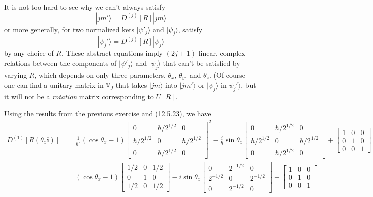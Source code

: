 \documentclass[../principles-of-quantum-mechanics.tex]{subfiles}
\begin{document}
\begin{questions}
		It is not too hard to see why we can't always satisfy
		$$|jm'\rangle = D^{(j)}[R]|jm\rangle$$
		or more generally, for two normalized kets $|\psi'_j\rangle$ and $|\psi_j\rangle$, satisfy
		$$|\psi_j'\rangle = D^{(j)}[R]|\psi_j\rangle$$
		by any choice of $R$. These abstract equations imply $(2j + 1)$ linear, complex relations between the components of $|\psi'_j\rangle$ and $|\psi_j\rangle$ that can't be satisfied by varying $R$, which depends on only three parameters, $\theta_x$, $\theta_y$, and $\theta_z$. (Of course one can find a unitary matrix in $\mathbb{V}_J$ that takes $|jm\rangle$ into $|jm'\rangle$ or $|\psi_j\rangle$ in $\psi_j'\rangle$, but it will not be a \textit{rotation} matrix corresponding to $U[R]$.
		
		\begin{solution}
			Using the results from the previous exercise and (12.5.23), we have
			\begin{align*}
				D^{(1)}[R(\theta_x\mathbf{i})] &= \frac{1}{\hbar^2}(\cos\theta_x - 1)\begin{bmatrix}0 & \hbar/2^{1/2} & 0 \\ \hbar/2^{1/2} & 0 & \hbar/2^{1/2} \\ 0 & \hbar/2^{1/2} & 0\end{bmatrix}^2 - \frac{i}{\hbar}\sin\theta_x\begin{bmatrix}0 & \hbar/2^{1/2} & 0 \\ \hbar/2^{1/2} & 0 & \hbar/2^{1/2} \\ 0 & \hbar/2^{1/2} & 0\end{bmatrix} + \begin{bmatrix}1 & 0 & 0 \\ 0 & 1 & 0 \\ 0 & 0 & 1\end{bmatrix} \\
				&= (\cos\theta_x - 1)\begin{bmatrix}1/2 & 0 & 1/2 \\ 0 & 1 & 0 \\ 1/2 & 0 & 1/2\end{bmatrix} - i\sin\theta_x\begin{bmatrix}0 & 2^{-1/2} & 0 \\ 2^{-1/2} & 0 & 2^{-1/2} \\ 0 & 2^{-1/2} & 0\end{bmatrix} + \begin{bmatrix}1 & 0 & 0 \\ 0 & 1 & 0 \\ 0 & 0 & 1\end{bmatrix} \\

\end{align*}
\end{solution}
\end{questions}
\end{document}
